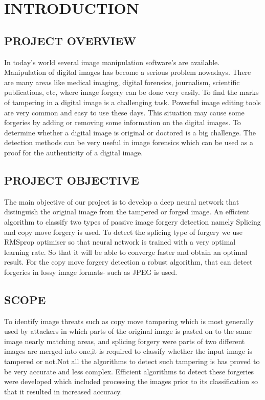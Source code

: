 
\chapter{INTRODUCTION} %

\section{PROJECT OVERVIEW}
In today's world several image manipulation software's are available. Manipulation of digital images has become a serious problem nowadays. There are many areas like medical imaging, digital forensics, journalism, scientific publications, etc, where image forgery can be done very easily. To find the marks of tampering in a digital image is a challenging task. Powerful image editing tools are very common and easy to use these days. This situation may cause some forgeries by adding or removing some information on the digital images. To determine whether a digital image is original or doctored is a big challenge. The detection methods can be very useful in image forensics which can be used as a proof for the authenticity of a digital image.
\section{PROJECT OBJECTIVE}
The main objective of our project is to develop a deep neural network that distinguish the original image from the tampered or forged image. An efficient algorithm to classify two types of passive image forgery detection namely Splicing and copy move forgery is used. To detect the splicing type of forgery we use  RMSprop optimiser so that neural network is trained with a very optimal learning rate. So that it will be able to converge faster and obtain an optimal result. For the copy move forgery detection a robust algorithm, that can detect forgeries in lossy image formats- such as JPEG is used.
\section{SCOPE}
To identify image threats such as copy move tampering which is most generally used by attackers in which parts of the original image is pasted on to the same image nearly matching areas, and splicing forgery were parts of two different images are merged into one,it is required to classify whether the input image is tampered or not.Not all the algorithms to detect such tampering is has proved to be very accurate and less complex. Efficient algorithms to detect these forgeries were developed which included processing the images prior to its classification so that it resulted in increased accuracy.
